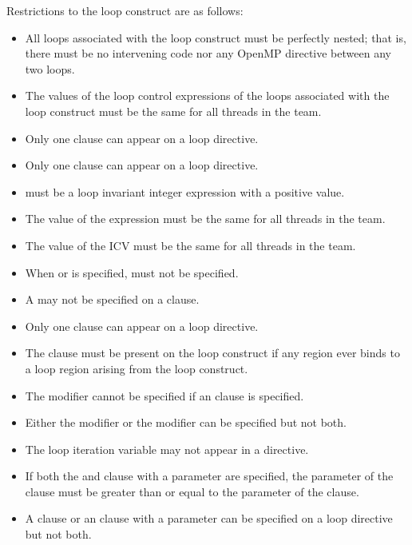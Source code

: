 \restrictions
Restrictions to the loop construct are as follows:

\begin{itemize}
\item All loops associated with the loop construct must be perfectly nested; that is, there 
must be no intervening code nor any OpenMP directive between any two loops.

\item The values of the loop control expressions of the loops associated with the loop 
construct must be the same for all threads in the team.

\item Only one  clause can appear on a loop directive.

\item Only one  clause can appear on a loop directive.

\item {} must be a loop invariant integer expression with a positive value.

\item The value of the  expression must be the same for all threads in the team.

\item The value of the  ICV must be the same for all threads in the team.

\item When  or  is specified,  must 
not be specified.

\item A  may not be specified on a  clause.

\item Only one  clause can appear on a loop directive.

\item The  clause must be present on the loop construct if any  region 
ever binds to a loop region arising from the loop construct.

\item The  modifier cannot be specified if an  clause is specified.

\item Either the  modifier or the  modifier can be specified but not both.

\item The loop iteration variable may not appear in a  directive.

\item If both the  and  clause with a parameter are specified,
the parameter of the  clause must be greater than or equal to the parameter of the
 clause.

\item A  clause or an  clause with a parameter can be specified on a loop directive but not both.
\end{itemize}


